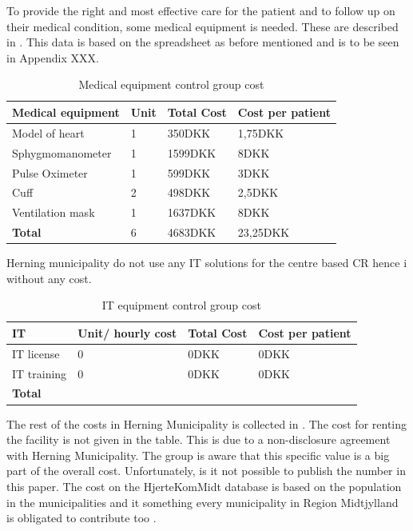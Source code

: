 To provide the right and most effective care for the patient and to follow up on their medical condition, some medical equipment is needed. These are described in . This data is based on the spreadsheet as before mentioned and is to be seen in Appendix XXX.

\begin{table}[H]
\begin{longtabu} to \linewidth{l l l l}
    \textbf{Medical equipment} & \textbf{Unit} &\textbf{Total Cost} & \textbf{Cost per patient} \\[-1ex]
    \midrule
    Model of heart   &  1 &  350DKK & 1,75DKK \\ \hline
    Sphygmomanometer  & 1 & 1599DKK & 8DKK  \\ \hline
    Pulse Oximeter    &  1 & 599DKK &   3DKK \\ \hline 
    Cuff    &  2 & 498DKK  &   2,5DKK  \\ \hline 
    Ventilation mask   &  1 & 1637DKK  &   8DKK \\
    \hline \hline \hline
    \textbf{Total} & 6 & 4683DKK & 23,25DKK
    \newline
    \newline
   \end{longtabu}
\caption{Medical equipment control group cost}
\label{tab: MeC}
\end{table}

Herning municipality do not use any IT solutions for the centre based CR hence  i without any cost. 

\begin{table}[H]
\begin{longtabu} to \linewidth{l l l l }
    \textbf{IT} & \textbf{Unit/ hourly cost} &\textbf{Total Cost} & \textbf{Cost per patient} \\[-1ex]
    \midrule
    IT license  & 0  & 0DKK  & 0DKK  \\  \hline
    IT training & 0 & 0DKK & 0DKK \\
    \hline \hline \hline
    \textbf{Total} &  &  & 
    \newline
    \newline
   \end{longtabu}
\caption{IT equipment control group cost}
\label{tab: ITC}
\end{table}

The rest of the costs in Herning Municipality is collected in . The cost for renting the facility is not given in the table. This is due to a non-disclosure agreement with Herning Municipality. The group is aware that this specific value is a big part of the overall cost. Unfortunately, is it not possible to publish the number in this paper.  
The cost on the HjerteKomMidt database is based on the population in the municipalities and it something every municipality in Region Midtjylland is obligated to contribute too \cite{hjerteKomMidt}. 

